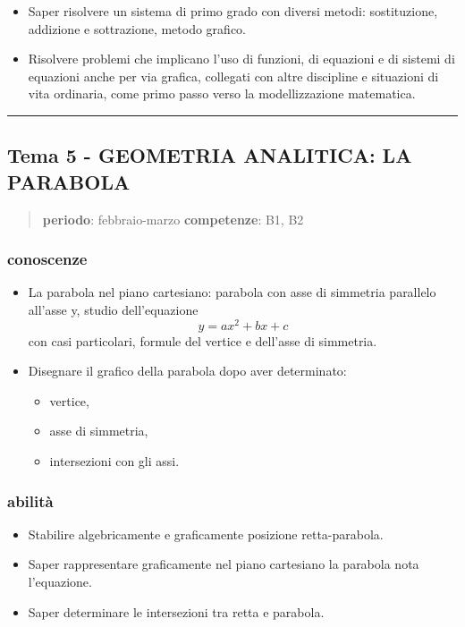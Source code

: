 \documentclass[12pt, a4paper]{exam}
\begin{document}
\begin{itemize}
\item
  Saper risolvere un sistema di primo grado con diversi metodi:
  sostituzione, addizione e sottrazione, metodo grafico.
\item
  Risolvere problemi che implicano l'uso di funzioni, di equazioni e di
  sistemi di equazioni anche per via grafica, collegati con altre
  discipline e situazioni di vita ordinaria, come primo passo verso la
  modellizzazione matematica.
\end{itemize}

\bigskip
\hrule
\bigskip

\subsection*{Tema 5 - GEOMETRIA ANALITICA: LA PARABOLA}

\begin{quote}
\textbf{periodo}: febbraio-marzo \textbf{competenze}: B1, B2
\end{quote}


\subsubsection*{conoscenze}

\begin{itemize}
\item
  La parabola nel piano cartesiano: parabola con asse di simmetria
  parallelo all'asse y, studio dell'equazione \[y=ax^2+bx+c\] con casi
  particolari, formule del vertice e dell'asse di simmetria.
\item
  Disegnare il grafico della parabola dopo aver determinato:

  \begin{itemize}
  \item
    vertice,
  \item
    asse di simmetria,
  \item
    intersezioni con gli assi.
  \end{itemize}
\end{itemize}

\subsubsection*{abilità}

\begin{itemize}
\item
  Stabilire algebricamente e graficamente posizione retta-parabola.
\item
  Saper rappresentare graficamente nel piano cartesiano la parabola nota
  l'equazione.
\item
  Saper determinare le intersezioni tra retta e parabola.
\end{itemize}
\end{document}
